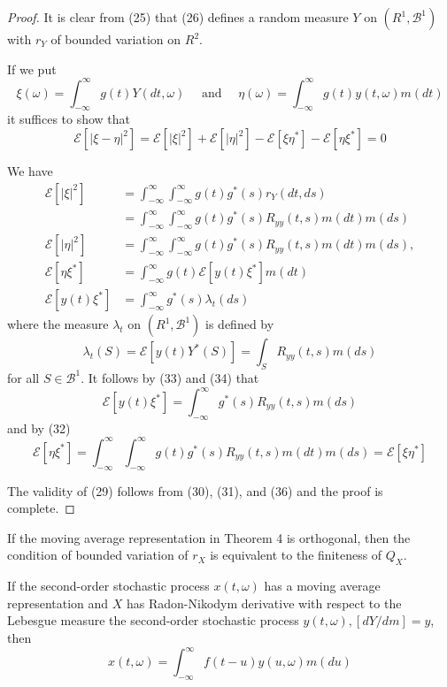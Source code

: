 \documentclass{article}
\begin{document}
\begin{proof}
It is clear from (25) that (26) defines a random measure $Y$ on $(R^{1}, \mathscr{B}^{1})$ with $r_{Y}$ of bounded variation on $R^{2}$.

If we put
\[
\xi(\omega)=\int_{-\infty}^{\infty} g(t) Y(d t, \omega) \quad \text{ and } \quad \eta(\omega)=\int_{-\infty}^{\infty} g(t) y(t, \omega) m(d t)
\]
it suffices to show that
\[
\mathscr{E}[|\xi-\eta|^{2}]=\mathscr{E}[|\xi|^{2}]+\mathscr{E}[|\eta|^{2}]-\mathscr{E}[\xi \eta^{*}]-\mathscr{E}[\eta \xi^{*}]=0
\]

We have
\[
\begin{aligned}
\mathscr{E}[|\xi|^{2}] &= \int_{-\infty}^{\infty} \int_{-\infty}^{\infty} g(t) g^{*}(s) r_{Y}(d t, d s) \\
&= \int_{-\infty}^{\infty} \int_{-\infty}^{\infty} g(t) g^{*}(s) R_{y y}(t, s) m(d t) m(d s) \\
\mathscr{E}[|\eta|^{2}] &= \int_{-\infty}^{\infty} \int_{-\infty}^{\infty} g(t) g^{*}(s) R_{y y}(t, s) m(d t) m(d s), \\
\mathscr{E}[\eta \xi^{*}] &= \int_{-\infty}^{\infty} g(t) \mathscr{E}[y(t) \xi^{*}] m(d t) \\
\mathscr{E}[y(t) \xi^{*}] &= \int_{-\infty}^{\infty} g^{*}(s) \lambda_{t}(d s)
\end{aligned}
\]
where the measure $\lambda_{t}$ on $(R^{1}, \mathscr{B}^{1})$ is defined by
\[
\lambda_{t}(S)=\mathscr{E}[y(t) Y^{*}(S)]=\int_{S} R_{y y}(t, s) m(d s)
\]
for all $S \in \mathscr{B}^{1}$. It follows by (33) and (34) that
\[
\mathscr{E}[y(t) \xi^{*}]=\int_{-\infty}^{\infty} g^{*}(s) R_{y y}(t, s) m(d s)
\]
and by (32)
\[
\mathscr{E}[\eta \xi^{*}]=\int_{-\infty}^{\infty} \int_{-\infty}^{\infty} g(t) g^{*}(s) R_{y y}(t, s) m(d t) m(d s)=\mathscr{E}[\xi \eta^{*}]
\]

The validity of (29) follows from (30), (31), and (36) and the proof is complete.
\end{proof}

If the moving average representation in Theorem 4 is orthogonal, then the condition of bounded variation of $r_{X}$ is equivalent to the finiteness of $Q_{X}$.

If the second-order stochastic process $x(t, \omega)$ has a moving average representation and $X$ has Radon-Nikodym derivative with respect to the Lebesgue measure the second-order stochastic process $y(t, \omega),[d Y / d m]=y$, then
\[
x(t, \omega)=\int_{-\infty}^{\infty} f(t-u) y(u, \omega) m(d u)
\]
\end{document}
